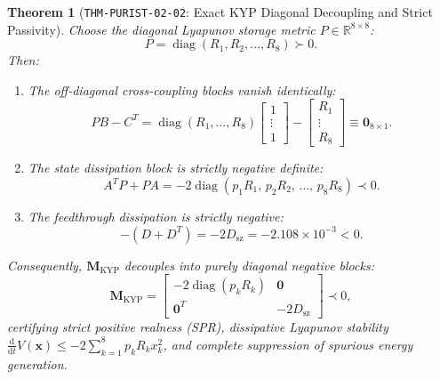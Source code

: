 \documentclass[11pt,a4paper,reqno]{article}
\theoremstyle{plain}
\newtheorem{theorem}{Theorem}[section]
\theoremstyle{definition}
\theoremstyle{remark}
\numberwithin{equation}{section}
\begin{document}
\begin{theorem}[\texttt{THM-PURIST-02-02}: Exact KYP Diagonal Decoupling and Strict Passivity]
\label{thm:kyp_passivity}
Choose the diagonal Lyapunov storage metric $P \in \mathbb{R}^{8 \times 8}$:
\begin{equation}
  P = \operatorname{diag}(R_1, R_2, \dots, R_8) \succ 0.
\end{equation}
Then:
\begin{enumerate}[label=(\roman*),leftmargin=1.8em]
  \item The off-diagonal cross-coupling blocks vanish identically:
  \begin{equation}
    P B - C^T = \operatorname{diag}(R_1, \dots, R_8) \begin{bmatrix} 1 \\ \vdots \\ 1 \end{bmatrix} - \begin{bmatrix} R_1 \\ \vdots \\ R_8 \end{bmatrix} \equiv \bm{0}_{8 \times 1}.
  \end{equation}
  \item The state dissipation block is strictly negative definite:
  \begin{equation}
    A^T P + P A = -2 \operatorname{diag}(p_1 R_1, \, p_2 R_2, \, \dots, \, p_8 R_8) \prec 0.
  \end{equation}
  \item The feedthrough dissipation is strictly negative:
  \begin{equation}
    -(D + D^T) = -2 D_{\mathrm{sz}} = -2.108 \times 10^{-3} < 0.
  \end{equation}
\end{enumerate}
Consequently, $\mathbf{M}_{\mathrm{KYP}}$ decouples into purely diagonal negative blocks:
\begin{equation}
  \mathbf{M}_{\mathrm{KYP}} = \begin{bmatrix} -2 \operatorname{diag}(p_k R_k) & \bm{0} \\ \bm{0}^T & -2 D_{\mathrm{sz}} \end{bmatrix} \prec 0,
\end{equation}
certifying strict positive realness (SPR), dissipative Lyapunov stability $\frac{\mathrm{d}}{\mathrm{d}t} V(\bm{x}) \le -2 \sum_{k=1}^8 p_k R_k x_k^2$, and complete suppression of spurious energy generation.
\end{theorem}
\end{document}
